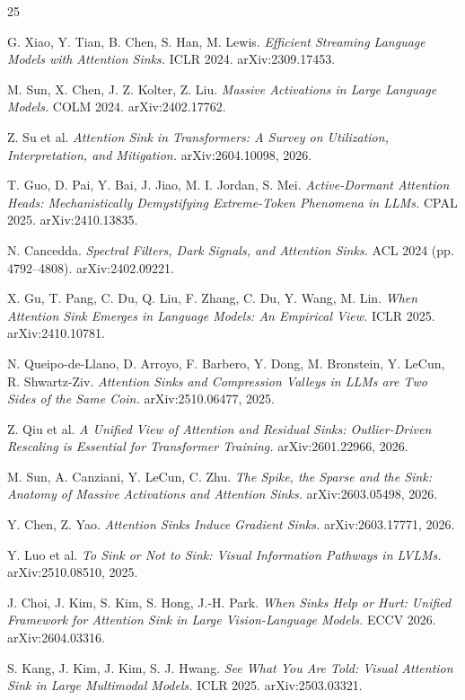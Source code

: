 \documentclass{article}
\begin{document}
\small
\begin{thebibliography}{25}

G. Xiao, Y. Tian, B. Chen, S. Han, M. Lewis. \textit{Efficient Streaming Language Models with Attention Sinks.} ICLR 2024. arXiv:2309.17453.

M. Sun, X. Chen, J. Z. Kolter, Z. Liu. \textit{Massive Activations in Large Language Models.} COLM 2024. arXiv:2402.17762.

Z. Su et al. \textit{Attention Sink in Transformers: A Survey on Utilization, Interpretation, and Mitigation.} arXiv:2604.10098, 2026.

T. Guo, D. Pai, Y. Bai, J. Jiao, M. I. Jordan, S. Mei. \textit{Active-Dormant Attention Heads: Mechanistically Demystifying Extreme-Token Phenomena in LLMs.} CPAL 2025. arXiv:2410.13835.

N. Cancedda. \textit{Spectral Filters, Dark Signals, and Attention Sinks.} ACL 2024 (pp. 4792--4808). arXiv:2402.09221.

X. Gu, T. Pang, C. Du, Q. Liu, F. Zhang, C. Du, Y. Wang, M. Lin. \textit{When Attention Sink Emerges in Language Models: An Empirical View.} ICLR 2025. arXiv:2410.10781.

N. Queipo-de-Llano, D. Arroyo, F. Barbero, Y. Dong, M. Bronstein, Y. LeCun, R. Shwartz-Ziv. \textit{Attention Sinks and Compression Valleys in LLMs are Two Sides of the Same Coin.} arXiv:2510.06477, 2025.

Z. Qiu et al. \textit{A Unified View of Attention and Residual Sinks: Outlier-Driven Rescaling is Essential for Transformer Training.} arXiv:2601.22966, 2026.

M. Sun, A. Canziani, Y. LeCun, C. Zhu. \textit{The Spike, the Sparse and the Sink: Anatomy of Massive Activations and Attention Sinks.} arXiv:2603.05498, 2026.

Y. Chen, Z. Yao. \textit{Attention Sinks Induce Gradient Sinks.} arXiv:2603.17771, 2026.

Y. Luo et al. \textit{To Sink or Not to Sink: Visual Information Pathways in LVLMs.} arXiv:2510.08510, 2025.

J. Choi, J. Kim, S. Kim, S. Hong, J.-H. Park. \textit{When Sinks Help or Hurt: Unified Framework for Attention Sink in Large Vision-Language Models.} ECCV 2026. arXiv:2604.03316.

S. Kang, J. Kim, J. Kim, S. J. Hwang. \textit{See What You Are Told: Visual Attention Sink in Large Multimodal Models.} ICLR 2025. arXiv:2503.03321.


\end{thebibliography}
\end{document}
